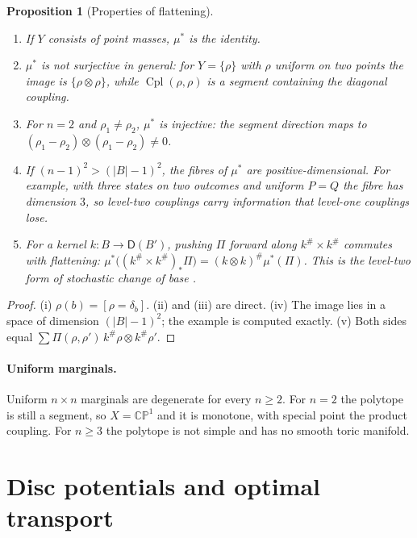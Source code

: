 \documentclass[11pt]{article}
\newtheorem{proposition}[theorem]{Proposition}
\theoremstyle{definition}
\theoremstyle{remark}
\newcommand{\D}{\mathsf{D}}
\newcommand{\Cpl}{\operatorname{Cpl}}
\newcommand{\CP}{\mathbb{CP}}
\begin{document}
\begin{proposition}[Properties of flattening]\label{prop:flat}
\leavevmode
\begin{enumerate}[label=(\roman*)]
\item If $Y$ consists of point masses, $\mu^*$ is the identity.
\item $\mu^*$ is not surjective in general: for $Y=\{\rho\}$ with $\rho$ uniform on two points the image is
  $\{\rho\otimes\rho\}$, while $\Cpl(\rho,\rho)$ is a segment containing the diagonal coupling.
\item For $n=2$ and $\rho_1\ne\rho_2$, $\mu^*$ is injective: the segment direction maps to
  $(\rho_1-\rho_2)\otimes(\rho_1-\rho_2)\ne0$.
\item If $(n-1)^2>(\lvert B\rvert-1)^2$, the fibres of $\mu^*$ are positive-dimensional. For example, with three
  states on two outcomes and uniform $P=Q$ the fibre has dimension $3$, so level-two couplings carry
  information that level-one couplings lose.
\item For a kernel $k\colon B\to\D(B')$, pushing $\Pi$ forward along $k^\#\times k^\#$ commutes with flattening:
  $\mu^*\big((k^\#\times k^\#)_*\Pi\big)=(k\otimes k)^\#\mu^*(\Pi)$. This is the level-two form of stochastic
  change of base \cite[Prop.~9.14]{Tower}.
\end{enumerate}
\end{proposition}
\begin{proof}
(i) $\rho(b)=[\rho=\delta_b]$. (ii) and (iii) are direct. (iv) The image lies in a space of dimension
$(\lvert B\rvert-1)^2$; the example is computed exactly. (v) Both sides equal
$\sum\Pi(\rho,\rho')\,k^\#\rho\otimes k^\#\rho'$.
\end{proof}

\paragraph{Uniform marginals.} Uniform $n\times n$ marginals are degenerate for every $n\ge2$. For $n=2$
the polytope is still a segment, so $X=\CP^1$ and it is monotone, with special point the product
coupling. For $n\ge3$ the polytope is not simple and has no smooth toric manifold.

\section{Disc potentials and optimal transport}\label{sec:potential}
\end{document}
